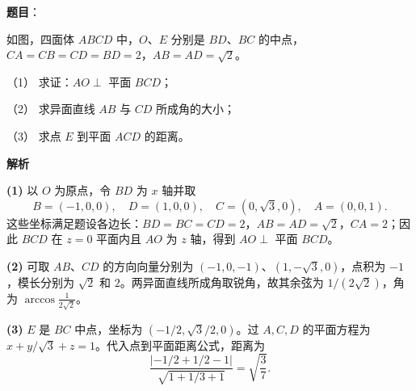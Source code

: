 \begin{answer}

\textbf{题目}：

如图，四面体 $ABCD$ 中，$O$、$E$ 分别是 $BD$、$BC$ 的中点，$CA=CB=CD=BD=2$，$AB=AD=\sqrt{2}$。

（1） 求证：$AO\perp$ 平面 $BCD$；

（2） 求异面直线 $AB$ 与 $CD$ 所成角的大小；

（3） 求点 $E$ 到平面 $ACD$ 的距离。
\nopagebreak[4]
\begin{center}\end{center}
\nopagebreak[4]
\textbf{解析}

\textbf{(1)} 以 $O$ 为原点，令 $BD$ 为 $x$ 轴并取
\nopagebreak[4]
\[
B=(-1,0,0),\quad D=(1,0,0),\quad C=(0,\sqrt3,0),\quad A=(0,0,1).
\]
这些坐标满足题设各边长：$BD=BC=CD=2$，$AB=AD=\sqrt2$，$CA=2$；因此 $BCD$ 在 $z=0$ 平面内且 $AO$ 为 $z$ 轴，得到 $AO\perp$ 平面 $BCD$。

\textbf{(2)} 可取 $AB$、$CD$ 的方向向量分别为 $(-1,0,-1)$、$(1,-\sqrt3,0)$，点积为 $-1$，模长分别为 $\sqrt2$ 和 $2$。两异面直线所成角取锐角，故其余弦为 $1/(2\sqrt2)$，角为 $\arccos\frac1{2\sqrt2}$。

\textbf{(3)} $E$ 是 $BC$ 中点，坐标为 $(-1/2,\sqrt3/2,0)$。过 $A,C,D$ 的平面方程为 $x+y/\sqrt3+z=1$。代入点到平面距离公式，距离为
\nopagebreak[4]
\[
\frac{| -1/2+1/2-1|}{\sqrt{1+1/3+1}}=\sqrt{\frac37}.
\]
\nopagebreak[4]
\begin{center}\end{center}
\nopagebreak[4]



\end{answer}
